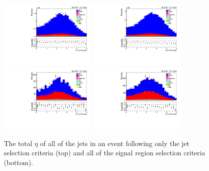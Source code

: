 \begin{figure}[ht]
\centering
\includegraphics[width=0.42\textwidth]{figs/background-estimation/plots/unblinded/prompt_ee_ttbarInc/totalJetEta_NPL_ee_jetSel_ee.pdf}
\includegraphics[width=0.42\textwidth]{figs/background-estimation/plots/unblinded/prompt_mumu_ttbarInc/totalJetEta_NPL_mumu_jetSel_mumu.pdf}
\\
\includegraphics[width=0.42\textwidth]{figs/background-estimation/plots/unblinded/prompt_ee_ttbarInc/totalJetEta_NPL_ee_wMass_ee.pdf}
\includegraphics[width=0.42\textwidth]{figs/background-estimation/plots/unblinded/prompt_mumu_ttbarInc/totalJetEta_NPL_mumu_wMass_mumu.pdf}
\caption{
The total $\eta$ of all of the jets in an event following only the jet selection criteria (top) and all of the signal region selection criteria (bottom).
}
\label{fig:App_SR_totalJetEta}
\end{figure}

